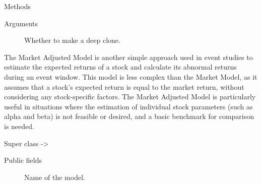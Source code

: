 \documentclass[a4paper]{book}
\begin{document}
\begin{Section}{Methods}
\begin{SubSection}{}

%
\begin{SubSubSection}{Arguments}

\begin{description}

\item[] Whether to make a deep clone.

\end{description}



\end{SubSubSection}

\end{SubSection}


\end{Section}
%
\begin{Description}
The Market Adjusted Model is another simple approach used in event studies
to estimate the expected returns of a stock and calculate its abnormal
returns during an event window. This model is less complex than the Market
Model, as it assumes that a stock’s expected return is equal to the market
return, without considering any stock-specific factors. The Market
Adjusted Model is particularly useful in situations where the estimation of
individual stock parameters (such as alpha and beta) is not feasible or
desired, and a basic benchmark for comparison is needed.
\end{Description}
%
\begin{Section}{Super class}
 -> 
\end{Section}
%
\begin{Section}{Public fields}

\begin{description}

\item[] Name of the model.

\end{description}


\end{Section}
%
\end{document}
